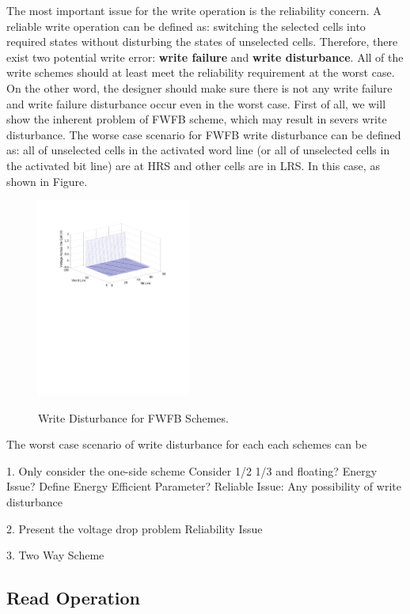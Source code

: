 The most important issue for the write operation is the reliability concern. A reliable write operation can be defined as: switching the selected cells into required states without disturbing the states of unselected cells. Therefore, there exist two potential write error:
\textbf{write failure} and \textbf{write disturbance}. All of the write schemes should at least meet the reliability requirement at the worst case. On the other word, the designer should make sure there is not any write failure and write failure disturbance occur even in the worst case. 
First of all, we will show the inherent problem of FWFB scheme, which may result in severs write disturbance. The worse case scenario for FWFB write disturbance can be defined as: all of unselected cells in the activated word line (or all of unselected cells in the activated bit line) are at HRS and other cells are in LRS. In this case, as shown in Figure. 
\begin{figure}%
\centering
  \includegraphics[width=0.45\textwidth]{./figures/FWFB.pdf}\\
  \caption{Write Disturbance for FWFB Schemes.}\label{fig:FWFR}
\end{figure}



  
The worst case scenario of write disturbance for each each schemes can be 




1. Only consider the one-side scheme
Consider 1/2 1/3 and floating?
Energy Issue? Define Energy Efficient Parameter?
Reliable Issue: Any possibility of write disturbance




2. Present the voltage drop problem
Reliability Issue

3. Two Way Scheme

\subsection{Read Operation} 